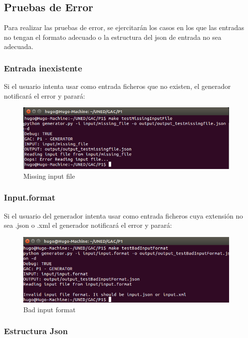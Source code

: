 \documentclass[a4paper,11pt]{book}
\begin{document}
\subsection{Pruebas de Error} 

Para realizar las pruebas de error, se ejercitarán los casos en los que las entradas no tengan el formato adecuado o la estructura del json de entrada no sea adecuada.  

\subsubsection{Entrada inexistente}
Si el usuario intenta usar como entrada ficheros que no existen, el generador notificará el error y parará: 

\begin{figure}[H]  
\centering 
\includegraphics[scale=0.35]{imagenes/missingInput.png}
\caption{ Missing input file  }  
\end{figure}

\subsubsection{Input.format}

Si el usuario del generador intenta usar como entrada ficheros cuya extensión no sea .json o .xml el generador notificará el error y parará: 

\begin{figure}[H]  
\centering 
\includegraphics[scale=0.35]{imagenes/badInputFormat.png}
\caption{ Bad input format  }  
\end{figure}

\subsubsection{Estructura Json}
\end{document}
